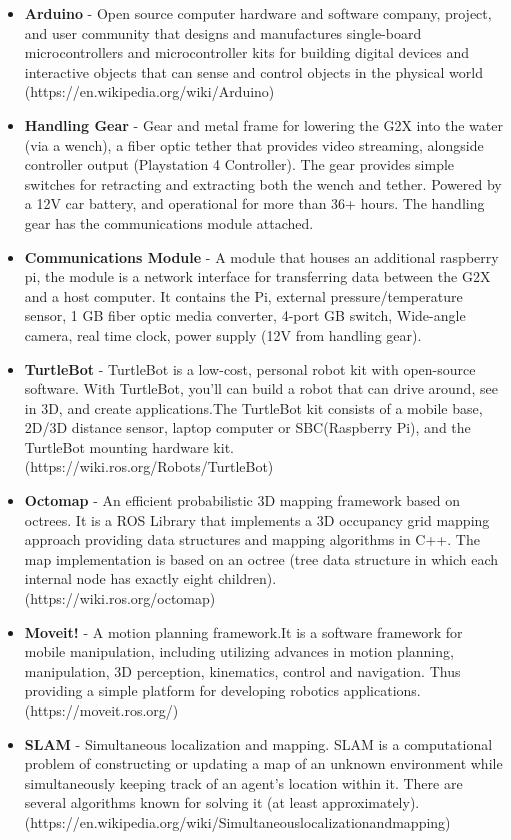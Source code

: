\documentclass[12pt]{article}
\begin{document}
\begin{itemize}
				\item \textbf{Arduino} - Open source computer hardware and software company, project, and user community that designs and manufactures 		single-board microcontrollers and microcontroller kits for building digital devices and interactive objects that can sense and control objects in the physical world\\ (https://en.wikipedia.org/wiki/Arduino)		
				\item \textbf{Handling Gear} - Gear and metal frame for lowering the G2X into the water (via a wench), a fiber optic tether that provides video streaming, alongside controller output (Playstation 4 Controller). The gear provides simple switches for retracting and extracting both the wench and tether. Powered by a 12V car battery, and operational for more than 36+ hours. The handling gear has the communications module attached.
				\item \textbf{Communications Module} - A module that houses an additional raspberry pi, the module is a network interface for transferring data between the G2X and a host computer. It contains the Pi, external pressure/temperature sensor, 1 GB fiber optic media converter, 4-port GB switch, Wide-angle camera, real time clock, power supply (12V from handling gear).
				\item \textbf{TurtleBot} - TurtleBot is a low-cost, personal robot kit with open-source software. With TurtleBot, you’ll can build a robot that can drive around, see in 3D, and create applications.The TurtleBot kit consists of a mobile base, 2D/3D distance sensor, laptop computer or SBC(Raspberry Pi), and the TurtleBot mounting hardware kit.\\
				(https://wiki.ros.org/Robots/TurtleBot)
				\item \textbf{Octomap} - An efficient probabilistic 3D mapping framework based on octrees. It is a ROS Library that implements a 3D occupancy grid mapping approach providing data structures and mapping algorithms in C++. The map implementation is based on an octree (tree data structure in which each internal node has exactly eight children). \\
				(https://wiki.ros.org/octomap)
				\item \textbf{Moveit!} - A motion planning framework.It is a software framework for mobile manipulation, including utilizing advances in motion planning, manipulation, 3D perception, kinematics, control and navigation. Thus providing a simple platform for developing robotics applications.\\
				(https://moveit.ros.org/)
				\item \textbf{SLAM} - Simultaneous localization and mapping. SLAM is a computational problem of constructing or updating a map of an unknown environment while simultaneously keeping track of an agent's location within it. There are several algorithms known for solving it (at least approximately).\\
				(https://en.wikipedia.org/wiki/Simultaneous\textunderscore localization\textunderscore and\textunderscore mapping)
			\end{itemize}
		
\end{document}
